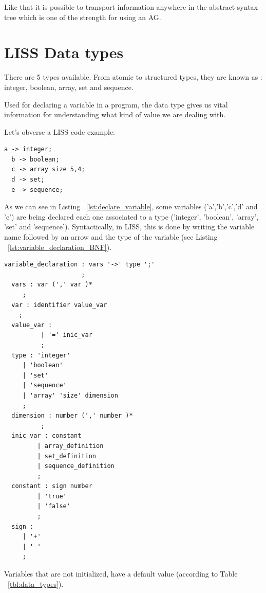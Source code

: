 \documentclass[
  oneside,
  11pt, a4paper,
  footinclude=true,
  headinclude=true,
  cleardoublepage=empty
]{scrbook}
\begin{document}
Like that it is possible to transport information anywhere in the abstract syntax tree which is one of the strength for using an AG.


\section{LISS Data types}
\label{sec:data_types}

There are 5 types available.
From atomic to structured types, they are known as : integer, boolean, array, set and sequence.

Used for declaring a variable in a program, the data type gives us vital information for understanding what kind of value we are dealing with.

Let's obverse a LISS code example:

\begin{lstlisting}[caption={Declaring a variable in LISS},label={lst:declare_variable}]
  a -> integer;
  b -> boolean;
  c -> array size 5,4;
  d -> set;
  e -> sequence;
\end{lstlisting}

As we can see in Listing ~\ref{lst:declare_variable}, some variables ('a','b','c','d' and 'e')  are being declared each one associated to a type ('integer', 'boolean', 'array', 'set' and 'sequence').
Syntactically, in LISS, this is done by writing the variable name followed by an arrow and the type of the variable (see Listing ~\ref{lst:variable_declaration_BNF}).

\begin{lstlisting}[caption={CFG for declaring a variable in LISS},label={lst:variable_declaration_BNF}]
  variable_declaration : vars '->' type ';'
                     ;
  vars : var (',' var )*
     ;
  var : identifier value_var
    ;
  value_var :
          | '=' inic_var
          ;
  type : 'integer'
     | 'boolean'
     | 'set'
     | 'sequence'
     | 'array' 'size' dimension
     ;
  dimension : number (',' number )*
          ;
  inic_var : constant
         | array_definition
         | set_definition
         | sequence_definition
         ;
  constant : sign number
         | 'true'
         | 'false'
         ;
  sign :
     | '+'
     | '-'
     ;

\end{lstlisting}

Variables that are not initialized, have a default value (according to Table ~\ref{tbl:data_types}).
\end{document}
